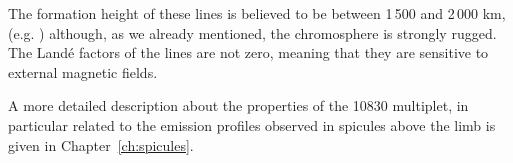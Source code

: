 The formation height of these lines is believed to be between 1\,500 and 2\,000 km,  (e.g. \citealt{Centeno06}) although, as we already mentioned, the chromosphere is strongly rugged. The Land\'e factors of the lines are not zero, meaning that they are sensitive to external magnetic fields.

A more detailed description about the properties of the  10830 multiplet, in particular related to the emission profiles 
observed in  spicules above the limb is given in Chapter~\ref{ch:spicules}.


\begin{comment}
\section{Stokes parameters}
Only work on this if I make use of Q,U,V right?

To fully describe the properties of a radiation field we need not only the intensity and its dependence with wavelength, but also the polarization status.  Light, being a electromagnetic transversal wave, has its plane of vibration perpendicular to the direction of propagation. The polarization state is the measurement of any preferred axis of the direction of vibration of the electric vector field.

 Let us consider a photon propagating along the $\vec{z}$ direction.  We choose a set of $\{\vec{x},\vec{y}\}$, orthonormal vectors defining a plane perpendicular to $z$. The vibration of the electric field on this plane can be then described in the general case of an ellipse (see Fig. \ref{figstokesfig1}) as

\begin{eqnarray}
E_{x}(t)=\epsilon_{x}e^{-i\omega t}=A_{x}e^{i(\phi_{x}-\omega t)},\\
E_{y}(t)=\epsilon_{y}e^{-i\omega t}=A_{y}e^{i(\phi_{y}-\omega t)},  
\label{stokes1}
\end{eqnarray}
 where $\omega$ is the angular frequency and $\epsilon_{x},\epsilon_{y}$ are two complex numbers that can be written in terms of the real numbers $A_{x},A_{y},\phi_{x},\phi_{y}$. These values set thus the polarization status of the wave. On the general case where the vector describes an ellipse the direction of rotation of the vibration axis is defined as the sign of 
 \begin{equation}
\delta=\phi_{x} -\phi_{y}
\end{equation}
where $\delta>0$ means anti-clockwise (incoming radiation) and $\delta<0$ means clockwise rotation.


\end{comment}
